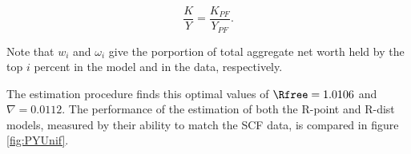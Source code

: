 \documentclass[\econtexRoot/Chp1proposal]{subfiles}
\begin{document}
$$ \frac{K}{Y} = \frac{K_{PF}}{Y_{PF}}. $$

\par Note that $w_i$ and $\omega_i$ give the porportion of total aggregate net worth held by the top $i$ percent in the model and in the data, respectively.

\par The estimation procedure finds this optimal values of $\Rfree = 1.0106$ and $\nabla = 0.0112$. The performance of the estimation of both the R-point and R-dist models, measured by their ability to match the SCF data, is compared in figure \ref{fig:PYUnif}.




\onlyinsubfile{}

\end{document}
